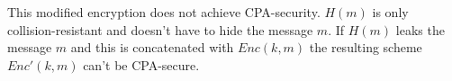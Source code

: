 This modified encryption does not achieve CPA-security.
\(H(m)\) is only collision-resistant and doesn't have to hide the message \(m\). If \(H(m)\) leaks the message \(m\) and this is concatenated with \(Enc(k, m)\) the resulting scheme \(Enc'(k, m)\) can't be CPA-secure. 
